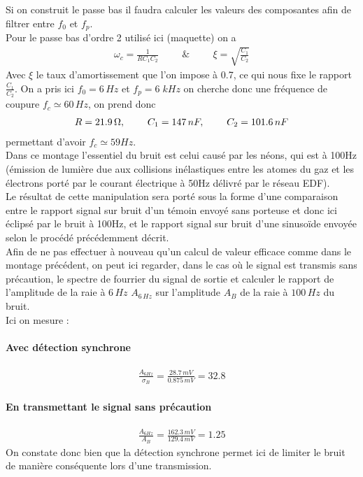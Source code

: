 \documentclass[12pt,prb,aps,epsf]{report}
\begin{document}
Si on construit le passe bas il faudra calculer les valeurs des composantes afin de filtrer entre $f_0$ et $f_p$.\\
Pour le passe bas d'ordre 2 utilisé ici (maquette) on a
\begin{eqnarray}
\omega_c = \frac{1}{RC_1C_2}\hspace{1cm}\&\hspace{1cm} \xi =\sqrt{\frac{C_1}{C_2}}
\end{eqnarray}
Avec $\xi$ le taux d'amortissement que l'on impose à 0.7, ce qui nous fixe le rapport $\frac{C_1}{C_2}$. On a pris ici $f_0=6\,Hz$ et $f_p=6\;kHz$ on cherche donc une fréquence de coupure $f_c \simeq 60\,Hz$, on prend donc 
\begin{eqnarray}
R=21.9\,\Omega,\hspace{0.8cm}C_1=147\,nF, \hspace{0.8cm} C_2=101.6\,nF
\end{eqnarray}
permettant d'avoir $f_c\simeq 59Hz$.\\

Dans ce montage l'essentiel du bruit est celui causé par les néons, qui est à 100Hz (émission de lumière due aux collisions inélastiques entre les atomes du gaz et les électrons porté par le courant électrique à 50Hz délivré par le réseau EDF).\\

Le résultat de cette manipulation sera porté sous la forme d'une comparaison entre le rapport signal sur bruit d'un témoin envoyé sans porteuse et donc ici éclipsé par le bruit à 100Hz, et le rapport signal sur bruit d'une sinusoïde envoyée selon le procédé précédemment décrit.\\ Afin de ne pas effectuer à nouveau qu'un calcul de valeur efficace comme dans le montage précédent, on peut ici regarder, dans le cas où le signal est transmis sans précaution, le spectre de fourrier du signal de sortie et calculer le rapport de l'amplitude de la raie à $6\,Hz$ $A_{6\,Hz}$ sur l'amplitude $A_B$ de la raie à $100\,Hz$ du bruit. \\

Ici on mesure :
\paragraph{Avec détection synchrone}
\begin{eqnarray}
\frac{A_{6Hz}}{\sigma_B} = \frac{28.7\,mV}{0.875\,mV}= 32.8
\end{eqnarray}
\paragraph{En transmettant le signal sans précaution}
\begin{eqnarray}
\frac{A_{6Hz}}{A_B} = \frac{162.3\,mV}{129.4\,mV} = 1.25
\end{eqnarray}
On constate donc bien que la détection synchrone permet ici de limiter le bruit de manière conséquente lors d'une transmission.\\
\end{document}
